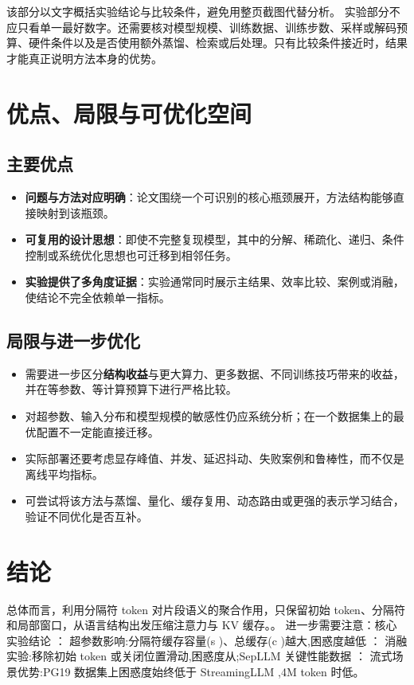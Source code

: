 \documentclass[UTF8,11pt,a4paper]{ctexart}
\newcommand{\term}[1]{\textbf{\textcolor{mainblue}{#1}}}
\begin{document}
该部分以文字概括实验结论与比较条件，避免用整页截图代替分析。
实验部分不应只看单一最好数字。还需要核对模型规模、训练数据、训练步数、采样或解码预算、硬件条件以及是否使用额外蒸馏、检索或后处理。只有比较条件接近时，结果才能真正说明方法本身的优势。

\section{优点、局限与可优化空间}
\subsection{主要优点}
\begin{itemize}
\item \term{问题与方法对应明确}：论文围绕一个可识别的核心瓶颈展开，方法结构能够直接映射到该瓶颈。
\item \term{可复用的设计思想}：即使不完整复现模型，其中的分解、稀疏化、递归、条件控制或系统优化思想也可迁移到相邻任务。
\item \term{实验提供了多角度证据}：实验通常同时展示主结果、效率比较、案例或消融，使结论不完全依赖单一指标。
\end{itemize}

\subsection{局限与进一步优化}
\begin{itemize}
\item 需要进一步区分\term{结构收益}与更大算力、更多数据、不同训练技巧带来的收益，并在等参数、等计算预算下进行严格比较。
\item 对超参数、输入分布和模型规模的敏感性仍应系统分析；在一个数据集上的最优配置不一定能直接迁移。
\item 实际部署还要考虑显存峰值、并发、延迟抖动、失败案例和鲁棒性，而不仅是离线平均指标。
\item 可尝试将该方法与蒸馏、量化、缓存复用、动态路由或更强的表示学习结合，验证不同优化是否互补。
\end{itemize}

\section{结论}
总体而言，利用分隔符 token 对片段语义的聚合作用，只保留初始 token、分隔符和局部窗口，从语言结构出发压缩注意力与 KV 缓存。。 进一步需要注意：核心实验结论 ： 超参数影响:分隔符缓存容量(s )、总缓存(c )越大,困惑度越低 ： 消融实验:移除初始 token 或关闭位置滑动,困惑度从;SepLLM 关键性能数据 ： 流式场景优势:PG19 数据集上困惑度始终低于 StreamingLLM ,4M token 时低。
\end{document}
